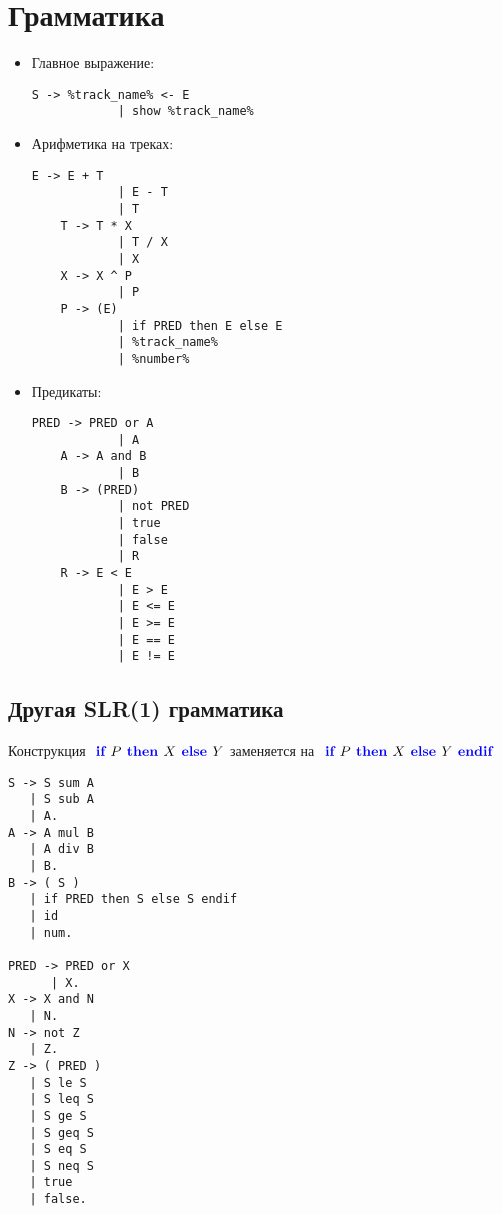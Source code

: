 \section*{Грамматика}

\begin{itemize}
\item Главное выражение:
\begin{lstlisting}[style=nonumbers]
	S -> %track_name% <- E
			| show %track_name%
\end{lstlisting}

\item Арифметика на треках:
\begin{lstlisting}[style=nonumbers]
	E -> E + T
			| E - T
			| T
	T -> T * X
			| T / X
			| X
	X -> X ^ P
			| P
	P -> (E) 
			| if PRED then E else E
			| %track_name% 
			| %number%
\end{lstlisting}

\item Предикаты:
\begin{lstlisting}[style=nonumbers]
	PRED -> PRED or A
			| A
	A -> A and B
			| B
	B -> (PRED)
			| not PRED
			| true
			| false
			| R
	R -> E < E
			| E > E
			| E <= E
			| E >= E
			| E == E
			| E != E
\end{lstlisting}

\end{itemize}

\newpage

\subsection*{Другая SLR(1) грамматика}
Конструкция $\text{\textbf{\color{blue}{ if }}} P \text{\textbf{\color{blue}{ then }}} X \text{\textbf{\color{blue}{ else }}} Y$ заменяется на $\text{\textbf{\color{blue}{ if }}} P \text{\textbf{\color{blue}{ then }}} X \text{\textbf{\color{blue}{ else }}} Y \text{\textbf{\color{blue}{ endif }}}$
\begin{lstlisting}[style=nonumbers]
S -> S sum A
   | S sub A
   | A.
A -> A mul B
   | A div B
   | B.
B -> ( S )
   | if PRED then S else S endif
   | id
   | num.

PRED -> PRED or X
      | X.
X -> X and N
   | N.
N -> not Z
   | Z.
Z -> ( PRED )
   | S le S
   | S leq S
   | S ge S
   | S geq S
   | S eq S
   | S neq S
   | true
   | false.
\end{lstlisting}

